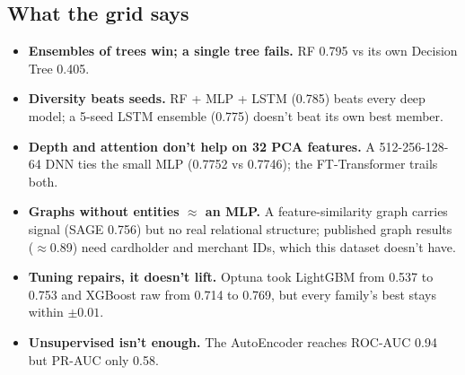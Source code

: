 \documentclass[11pt,a4paper]{article}
\begin{document}
\begin{center}
\end{center}

\subsection{What the grid says}
\begin{itemize}[leftmargin=1.0cm]
\item \textbf{Ensembles of trees win; a single tree fails.} RF 0.795 vs its own Decision Tree 0.405.
\item \textbf{Diversity beats seeds.} RF + MLP + LSTM (0.785) beats every deep model; a 5-seed LSTM
ensemble (0.775) doesn't beat its own best member.
\item \textbf{Depth and attention don't help on 32 PCA features.} A 512-256-128-64 DNN ties the small MLP
(0.7752 vs 0.7746); the FT-Transformer trails both.
\item \textbf{Graphs without entities $\approx$ an MLP.} A feature-similarity graph carries signal (SAGE
0.756) but no real relational structure; published graph results ($\approx$0.89) need cardholder and
merchant IDs, which this dataset doesn't have.
\item \textbf{Tuning repairs, it doesn't lift.} Optuna took LightGBM from 0.537 to 0.753 and XGBoost raw
from 0.714 to 0.769, but every family's best stays within $\pm0.01$.
\item \textbf{Unsupervised isn't enough.} The AutoEncoder reaches ROC-AUC 0.94 but PR-AUC only 0.58.
\end{itemize}
\end{document}
